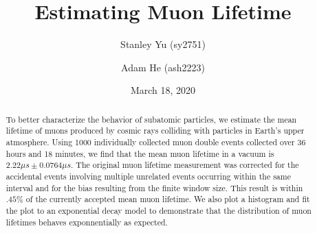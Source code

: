\documentclass[
 reprint,
 twocolumn,
 amsmath,amssymb,
 aps,
 pra,
 floatfix,
]{revtex4-1}
\begin{document}
\title{Estimating Muon Lifetime}

\author{Stanley Yu (sy2751)}
\author{Adam He (ash2223)}

\date{March 18, 2020}

\begin{abstract}

To better characterize the behavior of subatomic particles, we estimate the
mean lifetime of muons produced by cosmic rays colliding with particles in
Earth's upper atmosphere. Using 1000 individually collected muon double events
collected over 36 hours and 18 minutes, we find that the mean muon lifetime in
a vacuum is $2.22 \mu s \pm 0.0764 \mu s$. The original muon lifetime
measurement was corrected for the accidental events involving multiple unrelated
events occurring within the same interval and for the bias resulting from the
finite window size. This result is within $.45\%$ of the currently accepted
mean muon lifetime. We also plot a histogram and fit the plot to an exponential
decay model to demonstrate that the distribution of muon lifetimes behaves
exponnentially as expected.

\end{abstract}

\maketitle
\end{document}
